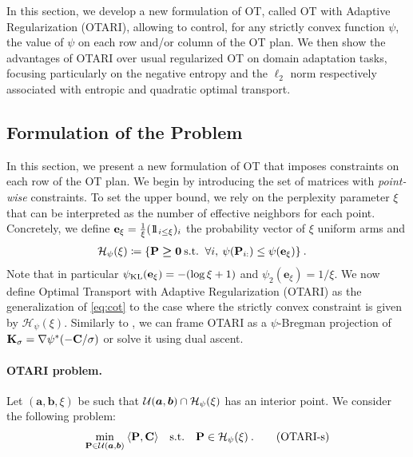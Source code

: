 In this section, we develop a new formulation of OT, called OT with Adaptive Regularization (OTARI), allowing to control, for any strictly convex function $\psi$, the value of $\psi$ on each row and/or column of the OT plan. 
We then show the advantages of OTARI over usual regularized OT on domain adaptation tasks, focusing particularly on the negative entropy and the $\ell_2$ norm respectively associated with entropic \citep{cuturi2013sinkhorn} and quadratic \citep{blondel2018smooth} optimal transport.


\subsection{Formulation of the Problem}\label{sec:pwot}

In this section, we present a new formulation of OT that imposes constraints on each row of the OT plan.
We begin by introducing the set of matrices with \emph{point-wise} constraints. To set the upper bound, we rely on the perplexity parameter $\xi$ \citep{van2023snekhorn} that can be interpreted as the number of effective neighbors for each point. Concretely, we define $\mathbf{e}_{\xi} = \frac{1}{\xi}(1\!\!1_{i \leq \xi})_{i}$ the probability vector of $\xi$ uniform arms and
\begin{align}
  \mathcal{H}_\psi(\xi) &\coloneqq \{{\mathbf{P}} \bm{\geq} \bm{0} \: \text{s.t.}\ \: \forall i, \: \psi({\mathbf{P}}_{i:}) \leq \psi(\mathbf{e}_{\xi}) \} \:.
\end{align}
Note that in particular $\psi_{\operatorname{KL}}(\mathbf{e}_{\xi}) = - (\log \xi + 1)$ and $\psi_2(\mathbf{e}_{\xi}) = 1/\xi$.
We now define Optimal Transport with Adaptive Regularization (OTARI) as the generalization of \eqref{eq:cot} to the case where the strictly convex constraint is given by $\mathcal{H}_\psi(\xi)$. Similarly to , we can frame OTARI as a $\psi$-Bregman projection of ${\mathbf{K}}_\sigma = \nabla \psi^*(-{\mathbf{C}} / \sigma)$ or solve it using dual ascent.

\paragraph{OTARI problem.}
  Let $(\bm{a}, \bm{b}, \xi)$ be such that ${\mathcal{U}}(\bm{a}, \bm{b}) \cap \mathcal{H}_\psi(\xi)$ has an interior point.
  We consider the following problem:
  \begin{align}\label{eq:pcOT}
    \min_{{\mathbf{P}} \in {\mathcal{U}}(\bm{a}, \bm{b})} \: \langle {\mathbf{P}}, {\mathbf{C}} \rangle \quad \text{s.t.} \quad  {\mathbf{P}} \in \mathcal{H}_\psi(\xi) \:.
    \tag{OTARI-s}
\end{align}

